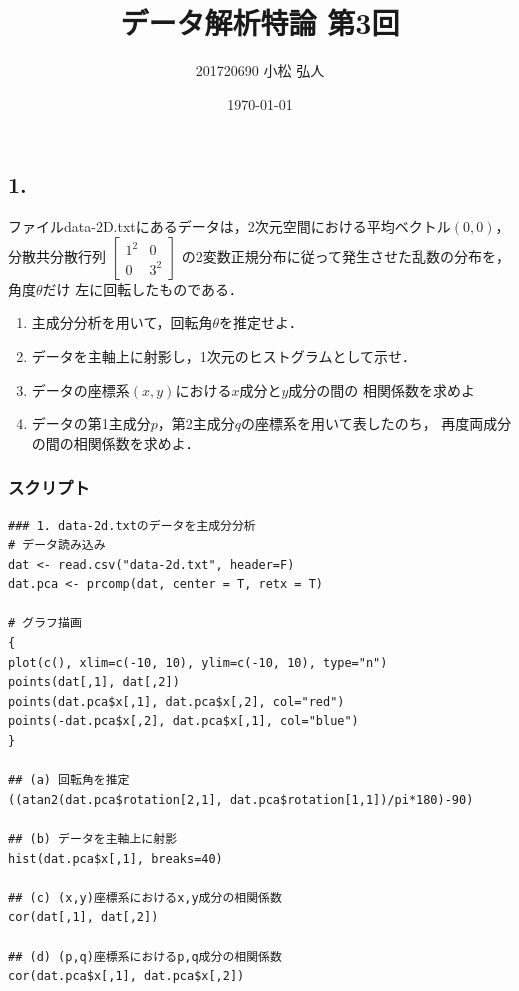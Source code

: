 \documentclass{jsarticle}
\title{データ解析特論 第3回}
\author{201720690 小松 弘人}
\date{\today}
\begin{document}
\maketitle
\thispagestyle{empty}
\subsection*{1.}
ファイルdata-2D.txtにあるデータは，2次元空間における平均ベクトル$(0,0)$，
分散共分散行列
$\left[ \begin{array} {ll} 1^2 & 0 \\ 0 & 3^2 \end{array} \right]$
の2変数正規分布に従って発生させた乱数の分布を，角度$\theta$だけ
左に回転したものである．

\begin{enumerate}
	\renewcommand{\labelenumi}{(\alph{enumi})}
	\item 主成分分析を用いて，回転角$\theta$を推定せよ．
	\item データを主軸上に射影し，1次元のヒストグラムとして示せ．
	\item データの座標系$(x,y)$における$x$成分と$y$成分の間の
		相関係数を求めよ
	\item データの第1主成分$p$，第2主成分$q$の座標系を用いて表したのち，
		再度両成分の間の相関係数を求めよ．
\end{enumerate}

\subsubsection*{スクリプト}
\begin{lstlisting}[basicstyle=\ttfamily\footnotesize, frame=single]
### 1. data-2d.txtのデータを主成分分析
# データ読み込み
dat <- read.csv("data-2d.txt", header=F)
dat.pca <- prcomp(dat, center = T, retx = T)

# グラフ描画
{
plot(c(), xlim=c(-10, 10), ylim=c(-10, 10), type="n")
points(dat[,1], dat[,2])
points(dat.pca$x[,1], dat.pca$x[,2], col="red")
points(-dat.pca$x[,2], dat.pca$x[,1], col="blue")
}

## (a) 回転角を推定
((atan2(dat.pca$rotation[2,1], dat.pca$rotation[1,1])/pi*180)-90)

## (b) データを主軸上に射影
hist(dat.pca$x[,1], breaks=40)

## (c) (x,y)座標系におけるx,y成分の相関係数
cor(dat[,1], dat[,2])

## (d) (p,q)座標系におけるp,q成分の相関係数
cor(dat.pca$x[,1], dat.pca$x[,2])
\end{lstlisting}
\end{document}
